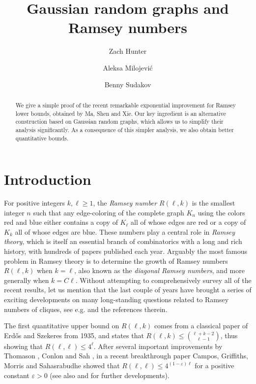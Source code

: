 \documentclass[11pt]{amsart}
\title{\vspace{-0.9cm} Gaussian random graphs and Ramsey numbers}
\date{}
\author{Zach Hunter}
\author{Aleksa Milojevi\'c}
\author{Benny Sudakov}
\theoremstyle{definition}
\def\eps{\varepsilon}
\begin{document}
\begin{abstract}
We give a simple proof of the recent remarkable exponential improvement for Ramsey lower bounds, obtained by Ma, Shen and Xie. Our key ingredient is an alternative construction based on Gaussian random graphs, which allows us to simplify their analysis significantly. As a consequence of this simpler analysis, we also obtain better quantitative bounds.
\end{abstract}

\maketitle

\section{Introduction}\label{sec:intro}

For positive integers $k, \ell\geq 1$, the \textit{Ramsey number} $R(\ell, k)$ is the smallest integer $n$ such that any edge-coloring of the complete graph $K_n$ using the colors red and blue either contains a copy of $K_\ell$ all of whose edges are red or a copy of $K_k$ all of whose edges are blue. These numbers play a central role in \textit{Ramsey theory}, which is itself an essential branch of combinatorics with a long and rich history, with hundreds of papers published each year. Arguably the most famous problem in Ramsey theory is to determine the growth of Ramsey numbers $R(\ell, k)$ when $k=\ell$, also known as the \textit{diagonal Ramsey numbers}, and more generally when $k=C\ell$. Without attempting to comprehensively survey all of the recent results, let us mention that the last couple of years have brought a series of exciting developments on many long-standing questions related to Ramsey numbers of cliques, see e.g. \cite{BBCGHMST, CGMS, CJMS25, CF21, HHKP25, MSX25, MV24, MV19} and the references therein.

The first quantitative upper bound on $R(\ell, k)$ comes from a classical paper of Erd\H{o}s and Szekeres \cite{ES35} from 1935, and states that $R(\ell, k)\leq \binom{\ell+k-2}{\ell-1}$, thus showing that $R(\ell, \ell)\leq 4^\ell$. After several important improvements by Thomason \cite{Tho88}, Conlon \cite{Con09} and Sah \cite{Sah23}, in a recent breakthrough paper Campos, Griffiths, Morris and Sahasrabudhe \cite{CGMS} showed that $R(\ell, \ell)\leq 4^{(1-\eps)\ell}$ for a positive constant $\eps>0$ (see also \cite{GNWW24} and \cite{BBCGHMST} for further developments).
\end{document}

